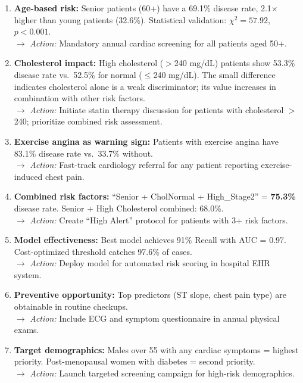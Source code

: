 \documentclass[12pt,a4paper]{article}
\begin{document}
\begin{enumerate}
    \item \textbf{Age-based risk:} Senior patients (60+) have a 69.1\% disease rate, 2.1$\times$ higher than young patients (32.6\%). Statistical validation: $\chi^2 = 57.92$, $p < 0.001$.\\
    $\rightarrow$ \textit{Action:} Mandatory annual cardiac screening for all patients aged 50+.

    \item \textbf{Cholesterol impact:} High cholesterol ($>$240 mg/dL) patients show 53.3\% disease rate vs.\ 52.5\% for normal ($\leq$240 mg/dL). The small difference indicates cholesterol alone is a weak discriminator; its value increases in combination with other risk factors.\\
    $\rightarrow$ \textit{Action:} Initiate statin therapy discussion for patients with cholesterol $>$240; prioritize combined risk assessment.

    \item \textbf{Exercise angina as warning sign:} Patients with exercise angina have 83.1\% disease rate vs.\ 33.7\% without.\\
    $\rightarrow$ \textit{Action:} Fast-track cardiology referral for any patient reporting exercise-induced chest pain.

    \item \textbf{Combined risk factors:} ``Senior + CholNormal + High\_Stage2'' = \textbf{75.3\%} disease rate.  Senior + High Cholesterol combined: 68.0\%.\\
    $\rightarrow$ \textit{Action:} Create ``High Alert'' protocol for patients with 3+ risk factors.

    \item \textbf{Model effectiveness:} Best model achieves 91\% Recall with AUC = 0.97. Cost-optimized threshold catches 97.6\% of cases.\\
    $\rightarrow$ \textit{Action:} Deploy model for automated risk scoring in hospital EHR system.

    \item \textbf{Preventive opportunity:} Top predictors (ST slope, chest pain type) are obtainable in routine checkups.\\
    $\rightarrow$ \textit{Action:} Include ECG and symptom questionnaire in annual physical exams.

    \item \textbf{Target demographics:} Males over 55 with any cardiac symptoms = highest priority. Post-menopausal women with diabetes = second priority.\\
    $\rightarrow$ \textit{Action:} Launch targeted screening campaign for high-risk demographics.
\end{enumerate}
\end{document}
